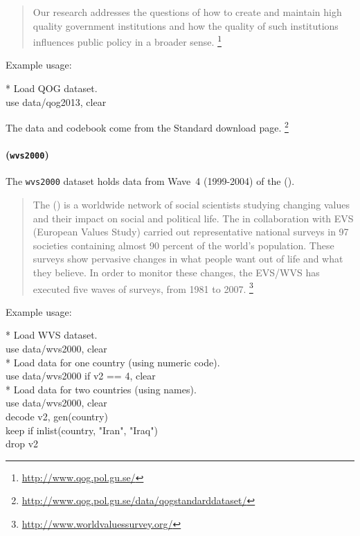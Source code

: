 \begin{quote}
	Our research addresses the questions of how to create and maintain high quality government institutions and how the quality of such institutions influences public policy in a broader sense.%
  \footnote{\url{http://www.qog.pol.gu.se/}}%
\end{quote}

Example usage:

\begin{docspec}
  * Load QOG dataset.\\%
  use data/qog2013, clear%
\end{docspec}

The data and codebook come from the \QOG Standard download page.%
   \footnote{\url{http://www.qog.pol.gu.se/data/qogstandarddataset/}}

\paragraph{\wvs (\texttt{wvs2000})}

The \texttt{wvs2000} dataset holds data from Wave~4 (1999-2004) of the \wvs (\WVS).

\begin{quote}
	The \wvs (\WVS) is a worldwide network of social scientists studying changing values and their impact on social and political life. The \WVS in collaboration with EVS (European Values Study) carried out representative national surveys in 97 societies containing almost 90 percent of the world's population. These surveys show pervasive changes in what people want out of life and what they believe. In order to monitor these changes, the EVS/WVS has executed five waves of surveys, from 1981 to 2007.%
	\footnote{\url{http://www.worldvaluessurvey.org/}}
\end{quote}

Example usage:

\begin{docspec}
  * Load WVS dataset.\\%
  use data/wvs2000, clear\\[1em]%
  * Load data for one country (using numeric code).\\%
	use data/wvs2000 if v2 == 4, clear\\[1em]%
  * Load data for two countries (using names).\\%
  use data/wvs2000, clear\\%
  decode v2, gen(country)\\%
  keep if inlist(country, "Iran", "Iraq")\\%
  drop v2%
\end{docspec}

